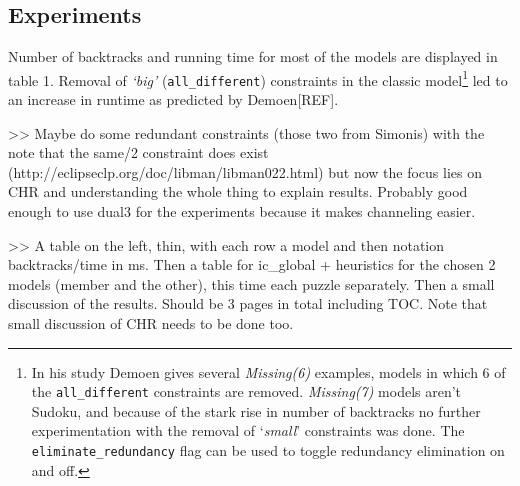 \subsection{Experiments}

Number of backtracks and running time for most of the models are displayed in table 1. Removal of \textit{`big'} (\texttt{all\_different}) constraints in the classic model\footnote{In his study Demoen gives several \textit{Missing(6)} examples, models in which 6 of the \texttt{all\_different} constraints are removed. \textit{Missing(7)} models aren't Sudoku, and because of the stark rise in number of backtracks no further experimentation with the removal of `\textit{small}' constraints was done. The \texttt{eliminate\_redundancy} flag can be used to toggle redundancy elimination on and off.} led to an increase in runtime as predicted by Demoen[REF]. \\\par

>> Maybe do some redundant constraints (those two from Simonis) with the note that the same/2 constraint does exist (http://eclipseclp.org/doc/libman/libman022.html) but now the focus lies on CHR and understanding the whole thing to explain results. Probably good enough to use dual3 for the experiments because it makes channeling easier.\\\par

>> A table on the left, thin, with each row a model and then notation backtracks/time in ms. Then a table for ic\_global + heuristics for the chosen 2 models (member and the other), this time each puzzle separately. Then a small discussion of the results. Should be 3 pages in total including TOC. Note that small discussion of CHR needs to be done too.